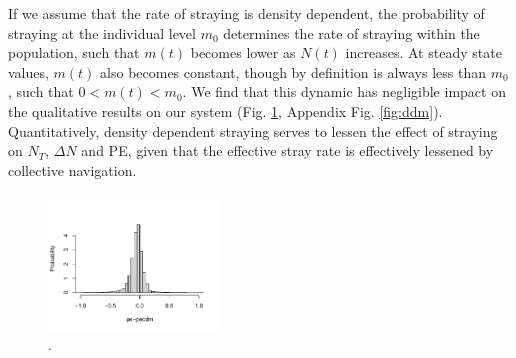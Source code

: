\documentclass[twocolumn,preprintnumbers,amsmath,amssymb,superscriptaddress]{revtex4}
\begin{document}
If we assume that the rate of straying is density dependent, the probability of straying at the individual level $m_0$ determines the rate of straying within the population, such that $m(t)$ becomes lower as $N(t)$ increases.
At steady state values, $m(t)$ also becomes constant, though by definition is always less than $m_0$, such that $0 < m(t) < m_0$.
We find that this dynamic has negligible impact on the qualitative results on our system (Fig. \ref{fig:diffddm}, Appendix Fig. \ref{fig:ddm}).
Quantitatively, density dependent straying serves to lessen the effect of straying on $N_T$, $\Delta N$ and PE, given that the effective stray rate is effectively lessened by collective navigation.

\begin{figure}
\centering
\includegraphics[width=0.4\textwidth]{figs/fig_diffddm.pdf}
\caption{
.
} \label{fig:diffddm}
\end{figure}
 
\end{document}
